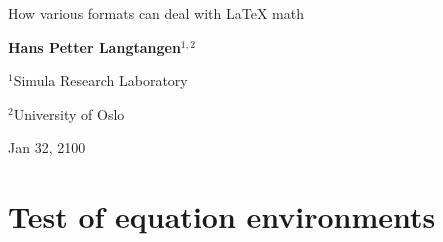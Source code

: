 \documentclass[%
oneside,                 %
final,                   %
10pt]{article}
\begin{document}
\newcommand{\exercisesection}[1]{\subsection*{#1}}


\thispagestyle{empty}
\begin{center}
{\LARGE\bf
\begin{spacing}{1.25}
How various formats can deal with {\LaTeX} math
\end{spacing}
}
\end{center}
\begin{center}
{\bf Hans Petter Langtangen${}^{1, 2}$} \\ [0mm]
\end{center}
\begin{center}
\centerline{{\small ${}^1$Simula Research Laboratory}}
\centerline{{\small ${}^2$University of Oslo}}
\end{center}
    
\begin{center}
Jan 32, 2100
\end{center}
\vspace{1cm}
\begin{abstract}
The purpose of this document is to test {\LaTeX} math in DocOnce with
various output formats.  Most {\LaTeX} math constructions are renedered
correctly by MathJax in plain HTML, but some combinations of
constructions may fail.  Unfortunately, only a subset of what works in
html MathJax also works in sphinx MathJax. The same is true for
markdown MathJax expresions (e.g., Jupyter notebooks).  Tests and
examples are provided to illustrate what may go wrong.
The recommendation for writing math that translates to MathJax in
html, sphinx, and markdown is to stick to the environments \Verb!\[ ... \]!, \texttt{equation}, \texttt{equation*}, \texttt{align}, \texttt{align*}, \texttt{alignat}, and
\texttt{alignat*} only. Test the math with sphinx output; if it works in that
format, it should work elsewhere too.
The current version of the document is translated from DocOnce source
to the format \textbf{pdflatex}.
\end{abstract}
\section{Test of equation environments}
\end{document}

